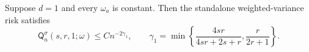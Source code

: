 Suppose \(d=1\) and every \(\omega_a\) is constant.  Then the standalone weighted-variance risk satisfies
\[
\mathsf Q_n^{\sigma}(s,r,1;\omega)\leq Cn^{-2\gamma_1},
\qquad
\gamma_1=\min\left\{\frac{4sr}{4sr+2s+r},\frac{r}{2r+1}\right\}.
\]